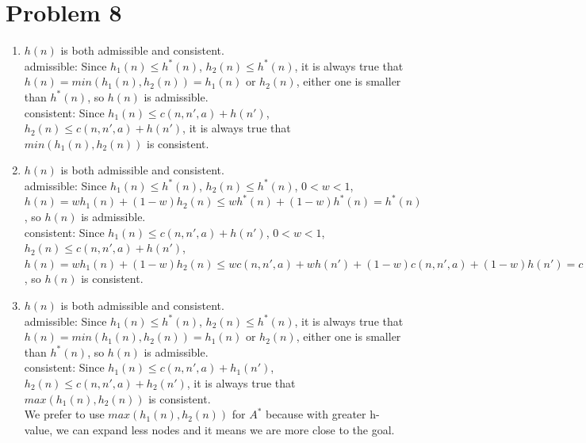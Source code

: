 \documentclass{article}
\begin{document}
\section*{Problem 8}
\begin{enumerate}[label=(\alph*)]
    \item $h(n)$ is both admissible and consistent.\\
    admissible: Since $h_1(n)\leq h^*(n)$, $h_2(n)\leq h^*(n)$, it is always true that $h(n)=min(h_1(n),h_2(n))=h_1(n)$ or $h_2(n)$, either one is smaller than $h^*(n)$, so $h(n)$ is admissible.\\
    consistent: Since $h_1(n) \leq c(n,n',a)+h(n')$, $h_2(n) \leq c(n,n',a)+h(n')$, it is always true that $min(h_1(n),h_2(n))$ is consistent.
    \item $h(n)$ is both admissible and consistent.\\
    admissible: Since $h_1(n)\leq h^*(n)$, $h_2(n)\leq h^*(n)$, $0<w<1$, $h(n)=wh_1(n)+(1-w)h_2(n)\leq wh^*(n) + (1-w)h^*(n) = h^*(n)$, so $h(n)$ is admissible.\\
    consistent: Since $h_1(n) \leq c(n,n',a)+h(n')$, $0<w<1$, $h_2(n) \leq c(n,n',a)+h(n')$, $h(n)=wh_1(n)+(1-w)h_2(n) \leq wc(n,n',a)+wh(n')+(1-w)c(n,n',a)+(1-w)h(n')= c(n,n',a)+h(n')$, so $h(n)$ is consistent.
    \item $h(n)$ is both admissible and consistent.\\
    admissible: Since $h_1(n)\leq h^*(n)$, $h_2(n)\leq h^*(n)$, it is always true that $h(n)=min(h_1(n),h_2(n))=h_1(n)$ or $h_2(n)$, either one is smaller than $h^*(n)$, so $h(n)$ is admissible.\\
    consistent: Since $h_1(n) \leq c(n,n',a)+h_1(n')$, $h_2(n) \leq c(n,n',a)+h_2(n')$, it is always true that $max(h_1(n),h_2(n))$ is consistent.\\
    We prefer to use $max(h_1(n),h_2(n))$ for $A^*$ because with greater h-value, we can expand less nodes and it means we are more close to the goal.
\end{enumerate}
\end{document}
